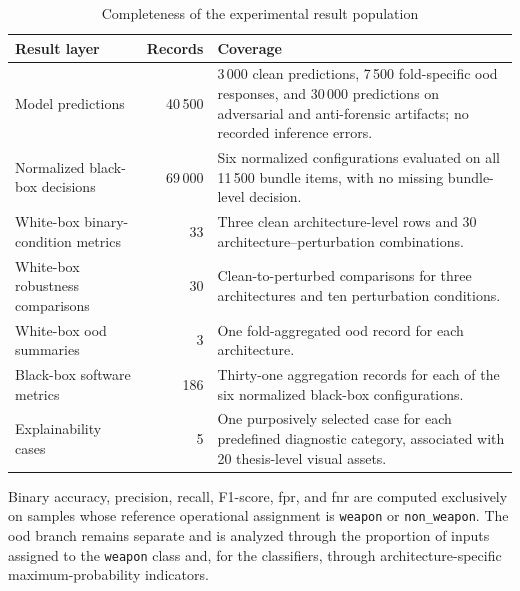 \begin{table}[H]
\centering
\small
\renewcommand{\arraystretch}{1.15}
\setlength{\tabcolsep}{5pt}
\caption{Completeness of the experimental result population}
\label{tab:results-evaluation-completeness}
\begin{tabularx}{0.96\textwidth}{@{}l r X@{}}
\toprule
\textbf{Result layer} &
\textbf{Records} &
\textbf{Coverage} \\
\midrule

Model predictions
&
40\,500
&
3\,000 clean predictions, 7\,500 fold-specific \gls{ood} responses, and
30\,000 predictions on adversarial and anti-forensic artifacts; no recorded
inference errors. \\

Normalized black-box decisions
&
69\,000
&
Six normalized configurations evaluated on all 11\,500 bundle items, with no
missing bundle-level decision. \\

White-box binary-condition metrics
&
33
&
Three clean architecture-level rows and 30 architecture--perturbation
combinations. \\

White-box robustness comparisons
&
30
&
Clean-to-perturbed comparisons for three architectures and ten perturbation
conditions. \\

White-box \gls{ood} summaries
&
3
&
One fold-aggregated \gls{ood} record for each architecture. \\

Black-box software metrics
&
186
&
Thirty-one aggregation records for each of the six normalized black-box
configurations. \\

Explainability cases
&
5
&
One purposively selected case for each predefined diagnostic category,
associated with 20 thesis-level visual assets. \\

\bottomrule
\end{tabularx}
\end{table}

Binary accuracy, precision, recall, F1-score, \gls{fpr}, and \gls{fnr} are
computed exclusively on samples whose reference operational assignment is
\texttt{weapon} or \texttt{non\_weapon}. The \gls{ood} branch remains
separate and is analyzed through the proportion of inputs assigned to the
\texttt{weapon} class and, for the classifiers, through architecture-specific
maximum-probability indicators.

